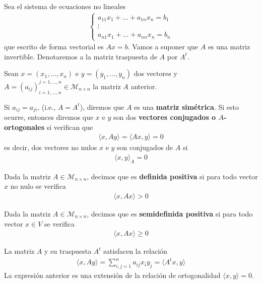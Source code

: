 Sea el sistema de ecuaciones no lineales
\begin{gather*}\left\{\begin{array}{c} a_{11}x_1+\ldots+a_{1n}x_n=b_1\\\vdots\\a_{n1}x_1+\ldots+a_{nn}x_n=b_n\end{array}\right.\end{gather*}
que escrito de forma vectorial es $Ax=b$. Vamos a suponer que $A$ es una matriz invertible. Denotaremos a la matriz traspuesta de $A$ por $A^t$.

Sean $x=(x_1, \ldots, x_n)$ e $y=(y_1, \ldots, y_n)$ dos vectores y $A=(a_{ij})_{i=1, \ldots, n}^{j=1, \ldots, n}\in\mathcal{M}_{n\times n}$ la matriz $A$ anterior.

Si $a_{ij}=a_{ji}$, (i.e., $A=A^t$), diremos que $A$ es una \textbf{matriz simétrica}. Si esto ocurre, entonces diremos que $x$ e $y$ son dos \textbf{vectores conjugados o $A$-ortogonales} si verifican que
\begin{gather*}\langle{x, Ay\rangle}=\langle{Ax, y\rangle}=0\end{gather*}
es decir, dos vectores no nulos $x$ e $y$ son conjugados de $A$ si
\begin{gather*}\langle{x, y\rangle}_A=0\end{gather*}

\begin{definition} Dada la matriz \(A \in \mathcal{M}_{n\times n}\), decimos que es \textbf{definida positiva} si para todo vector $x$ no nulo se verifica
\begin{gather*}\langle{x, Ax\rangle}>0\end{gather*}
\end{definition}

\begin{definition} Dada la matriz \(A \in \mathcal{M}_{n\times n}\), decimos que es \textbf{semidefinida positiva} si para todo vector $x\in V$ se verifica
\begin{gather*}\langle{x, Ax\rangle}\geq0\end{gather*}
\end{definition}
La matriz $A$ y su traspuesta $A^t$ satisfacen la relación
\begin{gather*}\langle{x, Ay\rangle}=\displaystyle\sum_{i, j=1}^na_{ij}x_iy_j=\langle{A^tx, y\rangle}\end{gather*}
La expresión anterior es una extensión de la relación de ortogonalidad $\langle{x, y\rangle}=0$.


